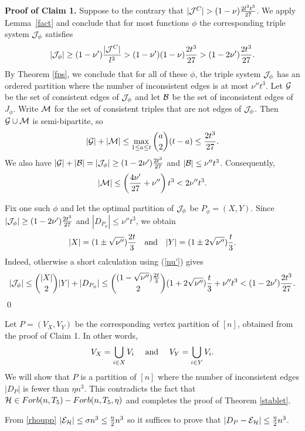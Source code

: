 \documentclass[11pt]{article}
\begin{document}
{\bf Proof of Claim 1.} Suppose to the contrary that $|\cJ^C|>
(1-\nu)\frac{2l^3 t^3}{27}$.   We  apply  Lemma~\ref{fact}  and
conclude that for most functions $\phi$ the corresponding triple
system ${\cal J}_{\phi}$ satisfies
$$|{\cal J}_{\phi}| \ge (1-\nu')\frac{|{\cal J}^C|}{l^3} > (1-\nu')(1-\nu)\frac{2t^3}{27}>(1-2\nu')\frac{2t^3}{27}.$$
By  Theorem \ref{fps}, we conclude that for all of these $\phi$, the
triple system ${\cal J}_{\phi}$ has an ordered partition where the number
of inconsistent edges is at most  $\nu'' t^3$.  Let ${{\cal G}}$ be the set of consistent edges of ${\cal J}_{\phi}$ and let ${\cal B}$ be the set of inconsistent edges of $J_{\phi}$. Write ${\cal M}$ for the set of consistent triples that are not edges of ${\cal J}_{\phi}$.  Then ${{\cal G}} \cup {\cal M}$ is semi-bipartite, so
$$|{{\cal G}}|+|{\cal M}| \le \max_{1 \le a \le t} {a \choose 2}(t-a)\le \frac{2t^3}{27}.$$
We also have $|{{\cal G}}|+|{\cal B}| =|{\cal J}_{\phi}|\ge (1-2\nu')\frac{2t^3}{27}$ and $|{\cal B}|\le \nu'' t^3$.  Consequently,
\begin{equation} \label{nu''} |\cM| \le \left(\frac{4\nu'}{27}+\nu''\right)t^3<2\nu''t^3. \end{equation}

Fix one such $\phi$ and let the optimal partition of ${\cal J}_{\phi}$ be
$P_{\phi}=(X,Y)$. Since
$|{\cal J}_{\phi}| \ge (1-2\nu') \frac{2t^3}{27}$ and
$|D_{P_{\phi}}|\le \nu''t^3$, we obtain
$$|X|= (1 \pm \sqrt{\nu''}) \frac{2t}{3} \quad  \hbox{\rm and} \quad
|Y|= (1 \pm 2\sqrt{\nu''}) \frac{t}{3}.$$ Indeed, otherwise a short
calculation using (\ref{nu'}) gives
$$|{\cal J}_{\phi}|\le {|X| \choose 2}|Y| +|D_{P_{\phi}}|\le {(1-\sqrt{\nu''})\frac{2t}{3} \choose 2}(1+2\sqrt{\nu''})\frac{t}{3}+\nu'' t^3<(1-2\nu')\frac{2t^3}{27}.$$
\qed

Let $P=(V_X,V_Y)$ be the corresponding vertex partition of $[n]$,
obtained from the proof of Claim 1. In other words,
$$V_X=\bigcup_{i \in X} V_i \quad \hbox{ and } \quad
V_Y=\bigcup_{i \in Y} V_i.$$
  We will show that $P$ is a partition
of $[n]$ where the number of inconsistent edges $|D_P|$ is fewer
than $\eta n^3$.  This contradicts the fact that $\mathcal{H} \in Forb(n, T_5)-Forb(n,
T_5, \eta)$ and completes the proof of Theorem \ref{stablet}.

From \eqref{rhoupp} $|{\cal E}_{\mathcal{H}}|\le \sigma n^3 \le
\frac{\eta}{2}n^3$ so it suffices to prove that $|D_P -{\cal E}_{\mathcal{H}}|\le
\frac{\eta}{2}n^3$.
\end{document}
